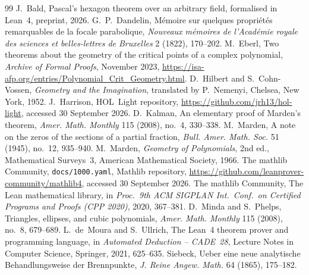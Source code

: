 \documentclass[11pt]{article}
\theoremstyle{remark}
\begin{document}
\begin{thebibliography}{99}
 J.~Bald, Pascal's hexagon theorem over an arbitrary field, formalised in
Lean~4, preprint, 2026.
 G.~P.~Dandelin, M\'emoire sur quelques propri\'et\'es remarquables de la
focale parabolique, \emph{Nouveaux m\'emoires de l'Acad\'emie royale des sciences et
belles-lettres de Bruxelles} 2 (1822), 170--202.
 M.~Eberl, Two theorems about the geometry of the critical points of a complex
polynomial, \emph{Archive of Formal Proofs}, November 2023,
\url{https://isa-afp.org/entries/Polynomial_Crit_Geometry.html}.
 D.~Hilbert and S.~Cohn-Vossen, \emph{Geometry and the Imagination}, translated
by P.~Nemenyi, Chelsea, New York, 1952.
 J.~Harrison, HOL~Light repository, \url{https://github.com/jrh13/hol-light},
accessed 30 September 2026.
 D.~Kalman, An elementary proof of Marden's theorem, \emph{Amer. Math. Monthly}
115 (2008), no.~4, 330--338.
 M.~Marden, A note on the zeros of the sections of a partial fraction,
\emph{Bull. Amer. Math. Soc.} 51 (1945), no.~12, 935--940.
 M.~Marden, \emph{Geometry of Polynomials}, 2nd ed., Mathematical Surveys~3,
American Mathematical Society, 1966.
 The mathlib Community, \texttt{docs/1000.yaml}, Mathlib repository,
\url{https://github.com/leanprover-community/mathlib4}, accessed 30 September 2026.
 The mathlib Community, The Lean mathematical library, in \emph{Proc.\ 9th
ACM SIGPLAN Int.\ Conf.\ on Certified Programs and Proofs (CPP 2020)}, 2020, 367--381.
 D.~Minda and S.~Phelps, Triangles, ellipses, and cubic polynomials,
\emph{Amer. Math. Monthly} 115 (2008), no.~8, 679--689.
 L.~de~Moura and S.~Ullrich, The Lean~4 theorem prover and programming language,
in \emph{Automated Deduction -- CADE~28}, Lecture Notes in Computer Science, Springer, 2021,
625--635.
 Siebeck, Ueber eine neue analytische Behandlungsweise der Brennpunkte,
\emph{J. Reine Angew. Math.} 64 (1865), 175--182.
\end{thebibliography}
\end{document}
